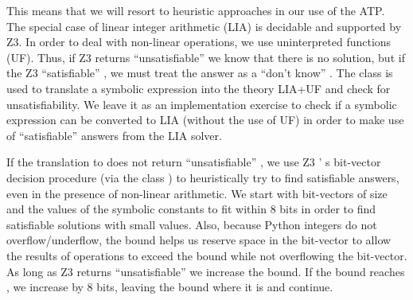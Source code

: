 ﻿\documentclass{IOS-Book-Article}
\begin{document}
\begin{mdP}[class={indent},data-line={845}]%
{}This means that we will resort to heuristic approaches in our use
of the%
{}{\mdNbsp}%
{} ATP.  The special case of linear integer arithmetic (LIA)
is decidable and supported by Z3. In order to deal with non-linear operations,
we use uninterpreted functions (UF). Thus, if Z3 returns
{}{\textquotedblleft}unsatisfiable{\textquotedblright}%
{} we know that there is no solution, but if the
Z3 %
{}{\textquotedblleft}satisfiable{\textquotedblright}%
{}, we must treat the answer as a %
{}{\textquotedblleft}don{'}t know{\textquotedblright}%
{}. 
The class %
{}%
{} is used to translate a symbolic expression
into the theory LIA+UF and check for unsatisfiability. We leave it as an
implementation exercise to check if a symbolic expression can
be converted to LIA (without the use of UF) in order to make
use of %
{}{\textquotedblleft}satisfiable{\textquotedblright}%
{} answers from the LIA solver.%
\end{mdP}%
\begin{mdP}[class={indent},data-line={857}]%
{}If the translation to %
{}%
{} does not return %
{}{\textquotedblleft}unsatisfiable{\textquotedblright}%
{}, we
use Z3%
{}{'}%
{}s bit-vector decision procedure (via the class
{}%
{}) to heuristically
try to find satisfiable answers, even in the presence of non-linear 
arithmetic. We start with bit-vectors of size %
{}%
{} and %
{}%
{} the values
of the symbolic constants to fit within 8 bits in order to find 
satisfiable solutions
with small values. Also, because Python integers do not overflow/underflow, 
the bound helps us reserve space in the bit-vector to allow the
results of operations to exceed the bound while not overflowing
the bit-vector. As long as Z3 returns %
{}{\textquotedblleft}unsatisfiable{\textquotedblright}%
{} we increase
the bound. If the bound reaches %
{}%
{}, we increase %
{}%
{} by 8 bits,
leaving the bound where it is and continue.%
\end{mdP}%
\end{document}
